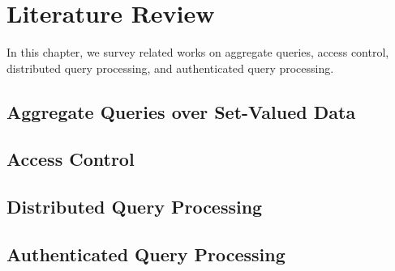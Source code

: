 \chapter{Literature Review}\label{chap:related-works}

In this chapter, we survey related works on aggregate queries, access control, distributed query processing, and authenticated query processing.

\section{Aggregate Queries over Set-Valued Data}

\section{Access Control}

\section{Distributed Query Processing}

\section{Authenticated Query Processing}
